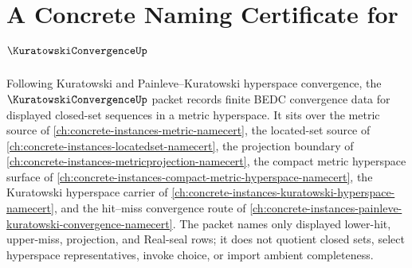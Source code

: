 \chapter{A Concrete Naming Certificate for $\KuratowskiConvergenceUp$}
\label{ch:concrete-instances-kuratowski-convergence-namecert}

Following Kuratowski and Painleve--Kuratowski hyperspace convergence, the $\KuratowskiConvergenceUp$ packet records finite BEDC convergence data for displayed closed-set sequences in a metric hyperspace. It sits over the metric source of \autoref{ch:concrete-instances-metric-namecert}, the located-set source of \autoref{ch:concrete-instances-locatedset-namecert}, the projection boundary of \autoref{ch:concrete-instances-metricprojection-namecert}, the compact metric hyperspace surface of \autoref{ch:concrete-instances-compact-metric-hyperspace-namecert}, the Kuratowski hyperspace carrier of \autoref{ch:concrete-instances-kuratowski-hyperspace-namecert}, and the hit--miss convergence route of \autoref{ch:concrete-instances-painleve-kuratowski-convergence-namecert}. The packet names only displayed lower-hit, upper-miss, projection, and Real-seal rows; it does not quotient closed sets, select hyperspace representatives, invoke choice, or import ambient completeness.

